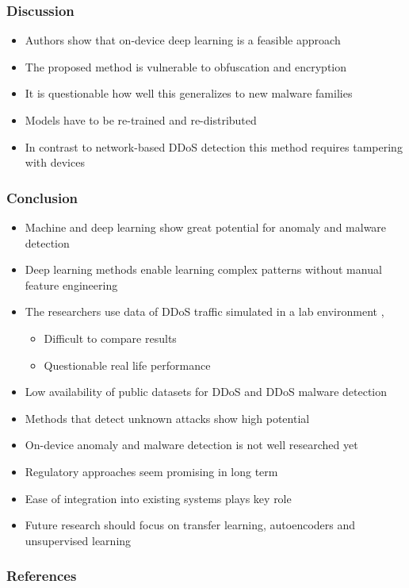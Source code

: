 \documentclass[10pt, presentation]{beamer}
\begin{document}
    \begin{frame}
        \frametitle{Discussion}
        \begin{itemize}
            \item Authors show that on-device deep learning is a feasible approach
            \item The proposed method is vulnerable to obfuscation and encryption
            \item It is questionable how well this generalizes to new malware families
            \item Models have to be re-trained and re-distributed
            \item In contrast to network-based DDoS detection this method requires tampering with devices
        \end{itemize}
    \end{frame}

    \begin{frame}
        \frametitle{Conclusion}
        \begin{itemize}
            \item Machine and deep learning show great potential for anomaly and malware detection \cite{Goodfellow-et-al-2016}
            \item Deep learning methods enable learning complex patterns without manual feature engineering \cite{Goodfellow-et-al-2016}
            \item The researchers use data of DDoS traffic simulated in a lab environment \cite{article:4}, \cite{inproceedings:1}
            \begin{itemize}
                \item Difficult to compare results
                \item Questionable real life performance
            \end{itemize}
            \item Low availability of public datasets for DDoS and DDoS malware detection
            \item Methods that detect unknown attacks show high potential \cite{article:4}
            \item On-device anomaly and malware detection is not well researched yet
            \item Regulatory approaches seem promising in long term \cite{article:12}
            \item Ease of integration into existing systems plays key role \cite{inproceedings:1}
            \item Future research should focus on transfer learning, autoencoders and unsupervised learning
        \end{itemize}
    \end{frame}

    \begin{frame}
        \frametitle{References}
        \printbibliography
    \end{frame}
\end{document}

